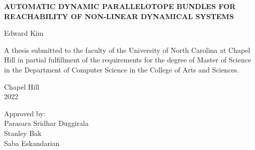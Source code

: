 \begin{titlepage}
\begin{center}


\vspace{2in}
\begin{singlespace}
\bf {\fontsize{12pt}{14.4pt}\selectfont \uppercase{Automatic Dynamic Parallelotope Bundles for Reachability of Non-linear Dynamical Systems}}
\end{singlespace}


\vspace{1in} %
\large
Edward Kim
\end{center}



\vspace{1in}
\begin{singlespace}
\noindent \large
A thesis submitted to the faculty of the University of North Carolina at Chapel Hill
in partial fulfillment of the requirements for the degree of Master of Science in
the Department of Computer Science in the College of Arts and Sciences.
\end{singlespace}


\vspace{1in}
\begin{center}
\begin{singlespace} \large
Chapel Hill\\
2022
\end{singlespace}
\end{center}


\vspace{1in}
\begin{flushright}
\begin{minipage}[t]{2in} \large
Approved by:\\
Parasara Sridhar Duggirala \\
Stanley Bak \\
Saba Eskandarian \\
\end{minipage}
\end{flushright}

\end{titlepage}
